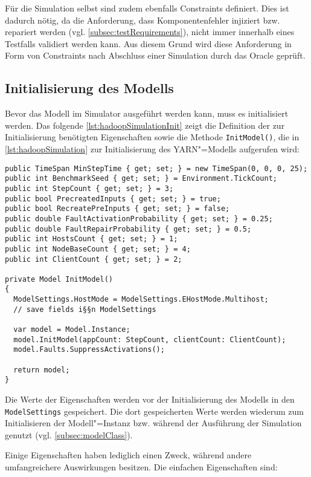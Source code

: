 Für die Simulation selbst sind zudem ebenfalls Constraints definiert.
Dies ist dadurch nötig, da die Anforderung, dass Komponentenfehler injiziert bzw. repariert werden (vgl. \cref{subsec:testRequirements}), nicht immer innerhalb eines Testfalls validiert werden kann.
Aus diesem Grund wird diese Anforderung in Form von Constraints nach Abschluss einer Simulation durch das Oracle geprüft.

\subsection{Initialisierung des Modells}
\label{subsec:simulationModelInit}

Bevor das Modell im Simulator ausgeführt werden kann, muss es initialisiert werden.
Das folgende \cref{lst:hadoopSimulationInit} zeigt die Definition der zur Initialisierung benötigten Eigenschaften sowie die Methode \texttt{InitModel()}, die in \cref{lst:hadoopSimulation} zur Initialisierung des YARN"=Modells aufgerufen wird:

\begin{lstlisting}[label=lst:hadoopSimulationInit,style=cs,
caption={Initialisierung des Modells für die Simulation}]
public TimeSpan MinStepTime { get; set; } = new TimeSpan(0, 0, 0, 25);
public int BenchmarkSeed { get; set; } = Environment.TickCount;
public int StepCount { get; set; } = 3;
public bool PrecreatedInputs { get; set; } = true;
public bool RecreatePreInputs { get; set; } = false;
public double FaultActivationProbability { get; set; } = 0.25;
public double FaultRepairProbability { get; set; } = 0.5;
public int HostsCount { get; set; } = 1;
public int NodeBaseCount { get; set; } = 4;
public int ClientCount { get; set; } = 2;

private Model InitModel()
{
  ModelSettings.HostMode = ModelSettings.EHostMode.Multihost;
  // save fields i§§n ModelSettings
  
  var model = Model.Instance;
  model.InitModel(appCount: StepCount, clientCount: ClientCount);
  model.Faults.SuppressActivations();
  
  return model;
}
\end{lstlisting}

Die Werte der Eigenschaften werden vor der Initialisierung des Modells in den \texttt{ModelSettings} gespeichert.
Die dort gespeicherten Werte werden wiederum zum Initialisieren der Modell"=Instanz bzw. während der Ausführung der Simulation genutzt (vgl. \cref{subsec:modelClass}).

Einige Eigenschaften haben lediglich einen Zweck, während andere umfangreichere Auswirkungen besitzen.
Die einfachen Eigenschaften sind:

